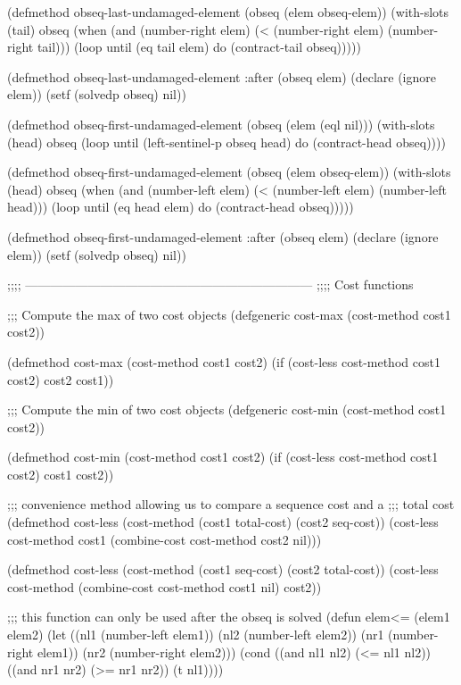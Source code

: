 (defmethod obseq-last-undamaged-element (obseq (elem obseq-elem))
  (with-slots (tail) obseq
    (when (and (number-right elem)
               (< (number-right elem)
                  (number-right tail)))
      (loop until (eq tail elem)
            do (contract-tail obseq)))))
  
(defmethod obseq-last-undamaged-element :after (obseq elem)
  (declare (ignore elem))
  (setf (solvedp obseq) nil))

(defmethod obseq-first-undamaged-element (obseq (elem (eql nil)))
  (with-slots (head) obseq
    (loop until (left-sentinel-p obseq head)
          do (contract-head obseq))))

(defmethod obseq-first-undamaged-element (obseq (elem obseq-elem))
  (with-slots (head) obseq
    (when (and (number-left elem)
               (< (number-left elem)
                  (number-left head)))
      (loop until (eq head elem)
            do (contract-head obseq)))))

(defmethod obseq-first-undamaged-element :after (obseq elem)
  (declare (ignore elem))
  (setf (solvedp obseq) nil))

;;;; ---------------------------------------------------------------------
;;;; Cost functions


;;; Compute the max of two cost objects
(defgeneric cost-max (cost-method cost1 cost2))

(defmethod cost-max (cost-method cost1 cost2)
  (if (cost-less cost-method cost1 cost2) cost2 cost1))

;;; Compute the min of two cost objects
(defgeneric cost-min (cost-method cost1 cost2))

(defmethod cost-min (cost-method cost1 cost2)
  (if (cost-less cost-method cost1 cost2) cost1 cost2))

;;; convenience method allowing us to compare a sequence cost and a
;;; total cost
(defmethod cost-less (cost-method (cost1 total-cost) (cost2 seq-cost))
  (cost-less cost-method cost1 (combine-cost cost-method cost2 nil)))

(defmethod cost-less (cost-method (cost1 seq-cost) (cost2 total-cost))
  (cost-less cost-method (combine-cost cost-method cost1 nil) cost2))

;;; this function can only be used after the obseq is solved
(defun elem<= (elem1 elem2)
  (let ((nl1 (number-left elem1))
        (nl2 (number-left elem2))
        (nr1 (number-right elem1))
        (nr2 (number-right elem2)))
    (cond ((and nl1 nl2) (<= nl1 nl2))
          ((and nr1 nr2) (>= nr1 nr2))
          (t nl1))))

